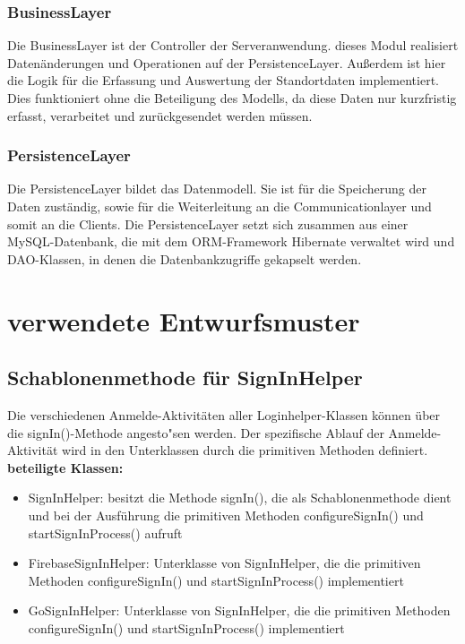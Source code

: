 \documentclass[11pt,a4paper]{report}
\begin{document}
\subsubsection{BusinessLayer}
Die BusinessLayer ist der Controller der Serveranwendung. dieses Modul realisiert Datenänderungen und Operationen auf der PersistenceLayer. Außerdem ist hier die Logik für die Erfassung und Auswertung der Standortdaten implementiert. Dies funktioniert ohne die Beteiligung des Modells, da diese Daten nur kurzfristig erfasst, verarbeitet und zurückgesendet werden müssen.

\subsubsection{PersistenceLayer}
Die PersistenceLayer bildet das Datenmodell. Sie ist für die Speicherung der Daten zuständig, sowie für die Weiterleitung an die Communicationlayer und somit an die Clients. Die PersistenceLayer setzt sich zusammen aus einer MySQL-Datenbank, die mit dem ORM-Framework Hibernate verwaltet wird und DAO-Klassen, in denen die Datenbankzugriffe gekapselt werden.

\newpage


\section{verwendete Entwurfsmuster}

\subsection{Schablonenmethode für SignInHelper}
Die verschiedenen Anmelde-Aktivitäten aller Loginhelper-Klassen können über die signIn()-Methode angesto"sen werden. Der spezifische Ablauf der Anmelde-Aktivität wird in den Unterklassen durch die primitiven Methoden definiert. \\

\textbf{beteiligte Klassen:}
\begin{itemize}
	\item SignInHelper: besitzt die Methode signIn(), die als Schablonenmethode dient und bei der Ausführung die primitiven Methoden configureSignIn() und startSignInProcess() aufruft
	\item FirebaseSignInHelper: Unterklasse von SignInHelper, die die primitiven Methoden configureSignIn() und startSignInProcess() implementiert
	\item GoSignInHelper: Unterklasse von SignInHelper, die die primitiven Methoden configureSignIn() und startSignInProcess() implementiert
\end{itemize}
\end{document}
